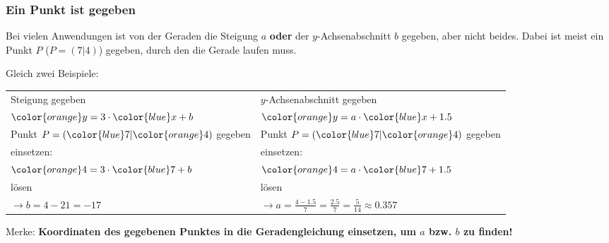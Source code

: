 
\subsubsection{Ein Punkt ist gegeben}
Bei vielen Anwendungen ist von der Geraden die Steigung $a$
\textbf{oder} der $y$-Achsenabschnitt $b$ gegeben, aber nicht
beides. Dabei ist meist ein Punkt $P$ (\zB $P=(7|4)$) gegeben, durch
den die Gerade laufen muss.

Gleich zwei Beispiele:

\begin{tabular}{p{8cm}|p{8cm}}
  Steigung gegeben & $y$-Achsenabschnitt gegeben \\
  ${\color{orange}y}=3\cdot{}{\color{blue}x}+b$ & ${\color{orange}y}=a\cdot{}{\color{blue}x}+1.5$\\
  \hline
  Punkt $P=({\color{blue}7}|{\color{orange}4})$ gegeben & Punkt $P=({\color{blue}7}|{\color{orange}4})$ gegeben\\
  \hline
  einsetzen: & einsetzen: \\
  ${\color{orange}4} = 3\cdot{}{\color{blue}7} + b$ & ${\color{orange}4}=a\cdot{}{\color{blue}7} + 1.5$\\
  \hline
  lösen & lösen\\
  $\longrightarrow b=4-21=-17$ & $\longrightarrow a=\frac{4-1.5}{7} =\frac{2.5}{7}=\frac{5}{14} \approx{} 0.357$

  \end{tabular}


Merke: \textbf{Koordinaten des gegebenen Punktes in die
  Geradengleichung einsetzen, um $a$ bzw. $b$ zu finden!}
